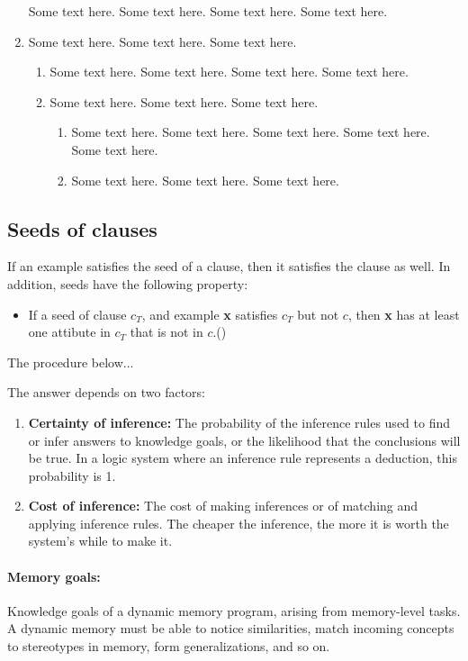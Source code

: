 \begin{article}
\begin{enumerate}
Some text here. Some text here. Some text here. Some text here. 

\item
Some text here. Some text here. Some text here.
\begin{enumerate}
\item
Some text here. Some text here. Some text here. Some text here. 

\item
Some text here. Some text here. Some text here.
\begin{enumerate}
\item
Some text here. Some text here. Some text here. Some text here. Some
text here. 

\item
Some text here. Some text here. Some text here.
\end{enumerate}
\end{enumerate}
\end{enumerate}


\subsection{Seeds of clauses}
If an example satisfies the seed of a clause, then it satisfies the clause
as well. In addition, seeds have the following property:


\begin{itemize}
\item[] 
If a seed of clause $c_T$, and example {\bf x} satisfies $c_T$ but
not $c$, then {\bf x} has at least one attibute in $c_T$ that
is not in $c$.\hfill({\tt*})
\end{itemize}
The procedure below...



The answer depends on two factors:
\begin{enumerate}
\item
{\bf Certainty of inference:} The probability of the inference
rules used to find or infer answers to knowledge goals, or the
likelihood that the conclusions will be true. In a logic system
where an inference rule represents a deduction, this probability is 1.

\item
{\bf Cost of inference:} The cost of making inferences or of matching and applying inference rules.
The cheaper the inference, the more it
is worth the system's while to make it.
\end{enumerate}

\paragraph{Memory goals:}Knowledge goals of a dynamic memory program,
arising from memory-level tasks. A dynamic memory must be able to
notice similarities, match incoming concepts to stereotypes in
memory, form generalizations, and so on.


\end{article}
